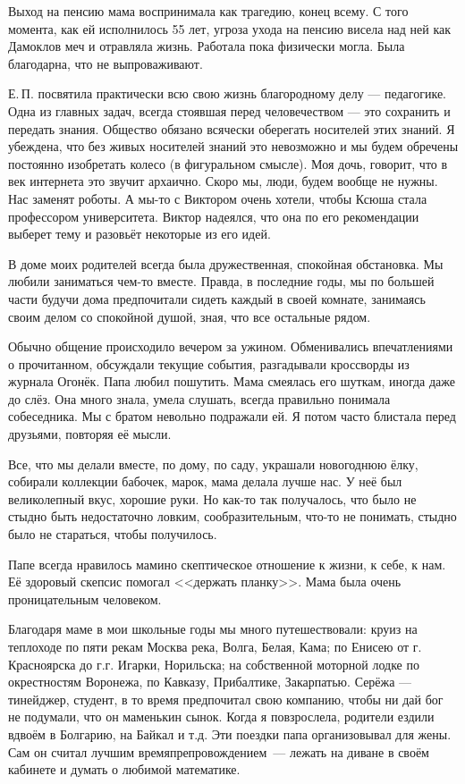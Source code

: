 Выход на пенсию мама воспринимала как трагедию, конец всему. С того момента, как ей исполнилось 55 лет, угроза ухода на пенсию висела над ней как Дамоклов меч и отравляла жизнь. Работала пока физически могла. Была благодарна, что не выпроваживают.

Е.\,П. посвятила практически всю свою жизнь благородному делу --- педагогике. Одна из главных задач, всегда стоявшая перед человечеством --- это сохранить и передать знания. Общество обязано всячески оберегать носителей этих знаний. Я убеждена, что без живых носителей знаний это невозможно и мы будем обречены постоянно изобретать колесо (в фигуральном смысле). Моя дочь, говорит, что в век интернета это звучит архаично. Скоро мы, люди, будем вообще не нужны. Нас заменят роботы. А мы-то с Виктором очень хотели, чтобы Ксюша стала профессором университета. Виктор надеялся, что она по его рекомендации выберет тему и разовьёт некоторые из его идей.

В доме моих родителей всегда была дружественная, спокойная обстановка. Мы любили заниматься чем-то вместе. Правда, в последние годы, мы по большей части будучи дома предпочитали сидеть каждый в своей комнате, занимаясь своим делом со спокойной душой, зная, что все остальные рядом.

Обычно общение происходило вечером за ужином. Обменивались впечатлениями о прочитанном, обсуждали текущие события, разгадывали кроссворды из журнала Огонёк. Папа любил пошутить. Мама  смеялась его шуткам,  иногда даже до слёз. Она много знала, умела слушать, всегда правильно понимала собеседника. Мы с братом невольно подражали ей. Я потом часто блистала перед друзьями, повторяя её мысли.

Все, что мы делали вместе, по дому, по саду, украшали новогоднюю ёлку, собирали коллекции бабочек, марок, мама делала лучше нас. У неё был великолепный вкус, хорошие руки. Но как-то так получалось, что было не стыдно быть недостаточно ловким, сообразительным, что-то не понимать, стыдно было не стараться, чтобы получилось.

Папе всегда нравилось мамино скептическое отношение к жизни, к себе, к нам. Её здоровый скепсис помогал <<держать планку>>. Мама была очень проницательным человеком.

Благодаря маме в мои школьные годы мы много путешествовали:
круиз на теплоходе по пяти рекам Москва река, Волга, Белая, Кама;
по Енисею от г. Красноярска до г.г. Игарки, Норильска;
на собственной моторной лодке по окрестностям Воронежа, по Кавказу, Прибалтике, Закарпатью.
Серёжа --- тинейджер, студент, в то время предпочитал свою компанию, чтобы ни дай бог не подумали, что он маменькин сынок.
Когда я повзрослела, родители ездили вдвоём в Болгарию, на Байкал и т.д.
Эти поездки папа организовывал для жены.
Сам он считал лучшим вре\-мя\-пре\-п\-ро\-во\-ж\-де\-ни\-ем~--- лежать на диване в своём кабинете и думать о любимой математике.

